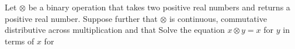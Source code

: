 Let $\otimes$ be a binary operation that takes two positive real numbers and returns a positive real number.  Suppose further that $\otimes$ is continuous, commutative  distributive across multiplication  and that   Solve the equation $x\otimes y=x$ for $y$ in terms of $x$ for 